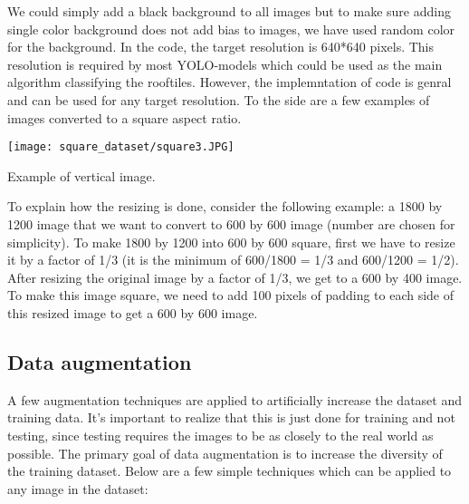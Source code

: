 We could simply add a black background to all images but to make sure adding single color background does not add bias to images, we have used random color for the background. 
In the code, the target resolution is 640*640 pixels. This resolution is required by most YOLO-models which could be used as the main algorithm classifying the rooftiles. However, the implemntation of code is genral and can be used for any target resolution. 
To the side are a few examples of images converted to a square aspect ratio.


\begin{marginfigure} %
	\texttt{[image: square\_dataset/square3.JPG]}
	\caption{Example of vertical image.}
\end{marginfigure}

To explain how the resizing is done, consider the following example: a 1800 by 1200 image that we want to convert to 600 by 600 image (number are chosen for simplicity). To make 1800 by 1200 into 600 by 600 square, first we have to resize it by a factor of 1/3 (it is the minimum of 600/1800 = 1/3 and 600/1200 = 1/2). After resizing the original image by a factor of 1/3, we get to a 600 by 400 image. To make this image square, we need to add 100 pixels of padding to each side of this resized image to get a 600 by 600 image.



\newpage
\subsection{Data augmentation}
\begin{fullwidth}
A few augmentation techniques are applied to artificially increase the dataset and training data. 
It's important to realize that this is just done for training and not testing, 
since testing requires the images to be as closely to the real world as possible. 
The primary goal of data augmentation is to increase the diversity of the training dataset. 
Below are a few simple techniques which can be applied to any image in the dataset:
\end{fullwidth}


